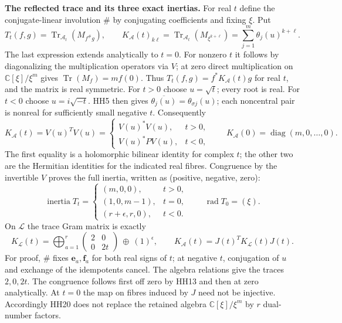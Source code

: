 \documentclass[11pt,a4paper]{article}
\theoremstyle{definition}\newtheorem{definition}[theorem]{Definition}
\begin{document}
\HH\textbf{The reflected trace and its three exact inertias.}
For real $t$ define the conjugate-linear involution $\#$ by conjugating
coefficients and fixing $\xi$. Put
\[
 T_t(f,g)=\operatorname{Tr}_{\mathcal A_t}
                    (M_{f^\#g}),\qquad
 K_{\mathcal A}(t)_{k\ell}
       =\operatorname{Tr}_{\mathcal A_t}(M_{\xi^{k+\ell}})
       =\sum_{j=1}^m\theta_j(u)^{k+\ell}.
 \tag{HH17}\label{hh:trace}
\]
The last expression extends analytically to $t=0$. For nonzero $t$
it follows by diagonalizing the multiplication operators via $V$;
at zero direct multiplication on $\mathbb C[\xi]/\xi^m$ gives
$\operatorname{Tr}(M_f)=mf(0)$.
Thus $T_t(f,g)=f^*K_{\mathcal A}(t)g$ for real $t$, and the matrix
is real symmetric. For $t>0$ choose $u=\sqrt t$; every root is real.
For $t<0$ choose $u=i\sqrt{-t}$. HH5 then gives
$\overline{\theta_j(u)}=\theta_{\sigma j}(u)$; each noncentral
pair is nonreal for sufficiently small negative $t$. Consequently
\[
 K_{\mathcal A}(t)=V(u)^TV(u)
   =\begin{cases}
     V(u)^*V(u),&t>0,\\
     V(u)^*P V(u),&t<0,
    \end{cases}
 \qquad K_{\mathcal A}(0)=\operatorname{diag}(m,0,\ldots,0).
 \tag{HH18}\label{hh:gram}
\]
The first equality is a holomorphic bilinear identity for complex $t$;
the other two are the Hermitian identities for the indicated real
fibres. Congruence by the invertible $V$ proves the full inertia,
written as (positive, negative, zero):
\[
 \operatorname{inertia}T_t=
 \begin{cases}
  (m,0,0),&t>0,\\
  (1,0,m-1),&t=0,\\
  (r+\epsilon,r,0),&t<0 .
 \end{cases}
 \qquad \operatorname{rad}T_0=(\xi).
 \tag{HH19}\label{hh:inertia}
\]
On $\mathcal L$ the trace Gram matrix is exactly
\[
 K_{\mathcal L}(t)=
       \bigoplus_{a=1}^r\begin{pmatrix}2&0\\0&2t\end{pmatrix}
            \ \oplus\ (1)^\epsilon,\qquad
 K_{\mathcal A}(t)=J(t)^T K_{\mathcal L}(t)J(t).
 \tag{HH20}\label{hh:auxgram}
\]
For proof, $\#$ fixes $\mathbf e_a,\mathbf f_a$ for both real signs
of $t$; at negative $t$, conjugation of $u$ and exchange of the
idempotents cancel. The algebra relations give the traces $2,0,2t$.
The congruence follows first off zero by HH13 and then at zero
analytically. At $t=0$ the map on fibres induced by $J$ need not be
injective. Accordingly HH20 does not replace the retained algebra
$\mathbb C[\xi]/\xi^m$ by $r$ dual-number factors.
\end{document}

